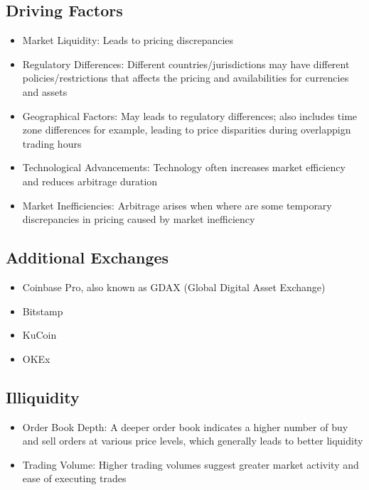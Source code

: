 \documentclass{article}
\begin{document}
\subsection{Driving Factors}
\begin{itemize}
  \item Market Liquidity: Leads to pricing discrepancies
  \item Regulatory Differences: Different countries/jurisdictions may have different policies/restrictions that affects the pricing and availabilities for currencies and assets
  \item Geographical Factors: May leads to regulatory differences; also includes time zone differences for example, leading to price disparities during overlappign trading hours
  \item Technological Advancements: Technology often increases market efficiency and reduces arbitrage duration
  \item Market Inefficiencies: Arbitrage arises when where are some temporary discrepancies in pricing caused by market inefficiency
\end{itemize}
\subsection{Additional Exchanges}
\begin{itemize}
  \item Coinbase Pro, also known as GDAX (Global Digital Asset Exchange)
  \item Bitstamp
  \item KuCoin
  \item OKEx
\end{itemize}
\subsection{Illiquidity}
\begin{itemize}
  \item Order Book Depth: A deeper order book indicates a higher number of buy and sell orders at various price levels, which generally leads to better liquidity
  \item Trading Volume: Higher trading volumes suggest greater market activity and ease of executing trades
\end{itemize}
\end{document}
